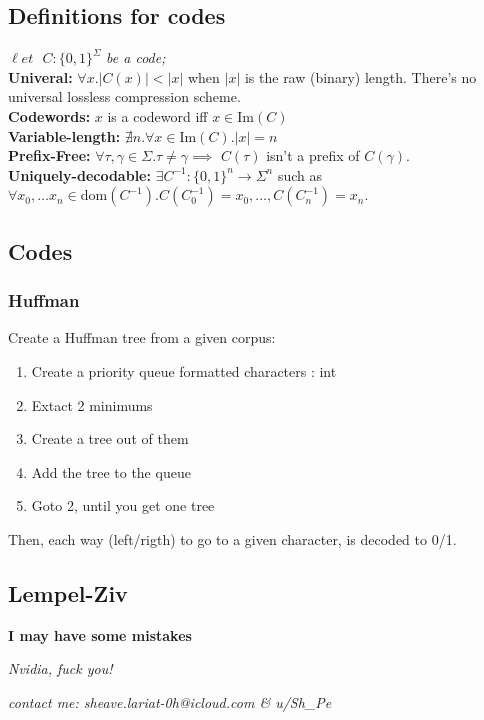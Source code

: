 \documentclass[]{article}
\newcommand\set   {\ell et \text{ }}
\newcommand\dom   {\mathrm{dom}}
\newcommand\Img   {\mathrm{Im}}
\newcommand\op    {^{-1}}
\begin{document}
	\begin{multicols}{2}
		
		\subsection{Definitions for codes}
		$\set C \colon \{0, 1\}^\Sigma$ \textit{be a code;} \\
		\textbf{Univeral: }$\forall x. |C(x)| < |x|$ when $|x|$ is the raw (binary) length. There's no universal lossless compression scheme. \\
		\textbf{Codewords: } $x$ is a codeword iff $x \in \Img(C)$ \\
		\textbf{Variable-length: } $\nexists n. \forall x \in \Img(C). |x| = n$ \\
		\textbf{Prefix-Free: }$\forall \tau, \gamma \in \Sigma. \tau \neq \gamma \!\!\!\implies\!\!\!\!$ $C(\tau)$ isn't a prefix of $C(\gamma)$. \\
		\textbf{Uniquely-decodable: }$\exists C\op \colon \{0, 1\}^n \to \Sigma^n$ such as $\forall x_0, \dots x_n \in \dom(C\op). C(C\op_0) = x_0, \dots, C(C\op_n) = x_n$. 
		
		\subsection{Codes}
		\subsubsection{Huffman}
		Create a Huffman tree from a given corpus: 
		\begin{enumerate}
			\item Create a priority queue formatted characters : int
			\item Extact 2 minimums
			\item Create a tree out of them
			\item Add the tree to the queue
			\item Goto 2, until you get one tree
		\end{enumerate}
		Then, each way (left/rigth) to go to a given character, is decoded to 0/1. 
		
		\subsection{Lempel-Ziv}
		
		
	\end{multicols}
	
	\dotfill
	\begin{center}
		\Large \textbf{I may have some mistakes}
	\end{center}
	\dotfill
	
	{\let\newpage\relax\maketitle}
	\begin{center}
		
		\small\textit{Nvidia, fuck you!}
		
		\small\textit{contact me: sheave.lariat-0h@icloud.com \& u/Sh\_Pe}
		
	\end{center}
	\maketitle
	
	
\end{document}
